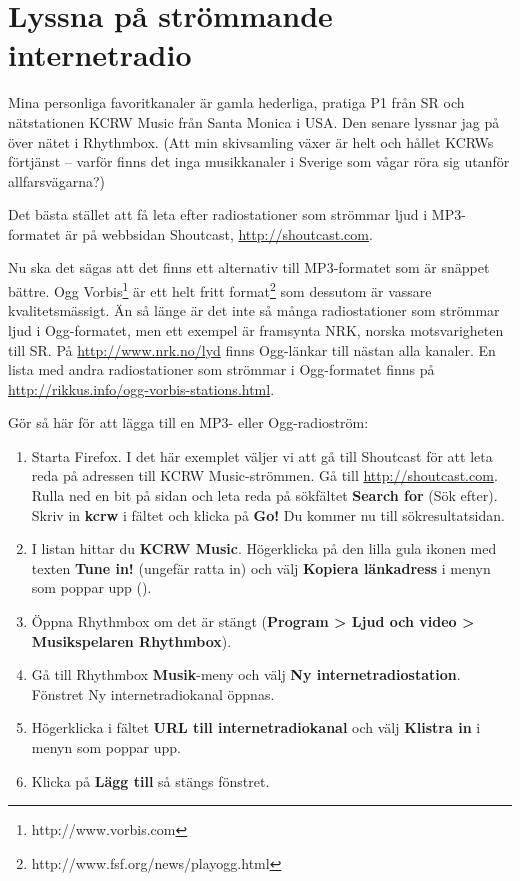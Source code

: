 \documentclass[a4paper,final]{memoir} %
\begin{document}
\section{Lyssna på strömmande internetradio}

Mina personliga favoritkanaler är gamla hederliga, pratiga P1 från SR och nätstationen KCRW Music från Santa Monica i USA. Den senare lyssnar jag på över nätet i Rhythmbox. (Att min skivsamling växer är helt och hållet KCRWs förtjänst -- varför finns det inga musikkanaler i Sverige som vågar röra sig utanför allfarsvägarna?)

Det bästa stället att få leta efter radiostationer som strömmar ljud i MP3-formatet är på webbsidan Shoutcast, \url{http://shoutcast.com}.

Nu ska det sägas att det finns ett alternativ till MP3-formatet som är snäppet bättre. Ogg Vorbis\footnote{http://www.vorbis.com} är ett helt fritt format\footnote{http://www.fsf.org/news/playogg.html} som dessutom är vassare kvalitetsmässigt. Än så länge är det inte så många radiostationer som strömmar ljud i Ogg-formatet, men ett exempel är framsynta NRK, norska motsvarigheten till SR. På \url{http://www.nrk.no/lyd} finns Ogg-länkar till nästan alla kanaler. En lista med andra radiostationer som strömmar i Ogg-formatet finns på \url{http://rikkus.info/ogg-vorbis-stations.html}.

Gör så här för att lägga till en MP3- eller Ogg-radioström:

\begin{enumerate}

\item Starta Firefox. I det här exemplet väljer vi att gå till Shoutcast för att leta reda på adressen till KCRW Music-strömmen. Gå till \url{http://shoutcast.com}. Rulla ned en bit på sidan och leta reda på sökfältet \textbf{Search for} (Sök efter). Skriv in \textbf{kcrw} i fältet och klicka på \textbf{Go!} Du kommer nu till sökresultatsidan.


\item I listan hittar du \textbf{KCRW Music}. Högerklicka på den lilla gula ikonen med texten \textbf{Tune in!} (ungefär ratta in) och välj \textbf{Kopiera länkadress} i menyn som poppar upp ().

\item Öppna Rhythmbox om det är stängt (\textbf{Program \textgreater{} Ljud och video \textgreater{} Musikspelaren Rhythmbox}). 

\item Gå till Rhythmbox \textbf{Musik}-meny och välj \textbf{Ny internetradiostation}. Fönstret Ny internetradiokanal öppnas.

\item Högerklicka i fältet \textbf{URL till internetradiokanal} och välj \textbf{Klistra in} i menyn som poppar upp. 

\item Klicka på \textbf{Lägg till} så stängs fönstret. 

\end{enumerate}
\end{document}

